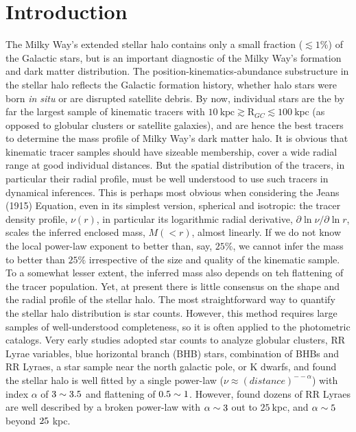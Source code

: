 \documentclass[12pt,preprint]{aastex}
\newcommand{\rgc}{\ensuremath{\mathrm{R}_{GC}}}
\begin{document}
\section{Introduction}\label{sec:Introduction}
The Milky Way's extended stellar halo contains only a small fraction ($\lesssim 1\%$) of the Galactic stars, but is an important diagnostic of the Milky Way's formation and dark matter distribution. The position-kinematics-abundance substructure in the stellar halo reflects the Galactic formation history, whether halo stars were born \textit{in situ} or are disrupted satellite debris. By now, individual stars are the by far the largest sample of
kinematic tracers with
$10~\mathrm{kpc}\gtrsim \rgc\lesssim 100~\mathrm{kpc}$ (as opposed to globular clusters or satellite galaxies), and are hence the best tracers to determine the mass profile of Milky Way's dark matter halo. It is obvious that kinematic tracer samples should have sizeable membership, cover a wide radial range at good individual distances. But the spatial distribution of the tracers, in particular their radial profile, must be well understood to use such tracers in dynamical inferences. This is perhaps most obvious when considering the Jeans (1915) Equation, even in its simplest version, spherical and isotropic: the tracer
density profile, $\nu (r)$, in particular its logarithmic radial derivative,
$\partial{\ln \nu}/\partial{\ln r}$, scales the inferred enclosed mass, $M(<r)$, almost linearly.
If we do not know the local power-law exponent to better than, say, $25\%$, we cannot
infer the mass to better than $25\%$ irrespective of the size and quality of the kinematic sample. To a somewhat lesser extent, the inferred mass also depends on teh flattening of the tracer population. Yet, at present there is little consensus on the shape and the radial profile of the stellar halo.
The most straightforward way to quantify the stellar halo distribution is star counts. However, this method requires large samples of well-understood completeness, so it is often applied to the photometric catalogs. Very early studies adopted star counts to analyze globular clusters\citep{Harris1976}, RR Lyrae variables\citep{Hawkins1984,Wetterer1996}, blue horizontal branch (BHB) stars\citep{Sommer-Larsen1987}, combination of BHBs and RR Lyraes\citep{Sluis1998}, a star sample near the north galactic pole\citep{Soubiran1993}, or K dwarfs\citep{Gould1998}, and found the stellar halo is well fitted by a single power-law ($\nu \approx (distance)^{−-\alpha}$) with index $\alpha$ of $\rm 3\sim3.5$ and flattening of $\rm 0.5\sim1$. However, \citet{Saha1985} found dozens of RR Lyraes are well described by a broken power-law with $\rm \alpha \sim 3$ out to $25~$kpc, and $\rm \alpha \sim 5$ beyond $\rm 25~$kpc.
\end{document}
